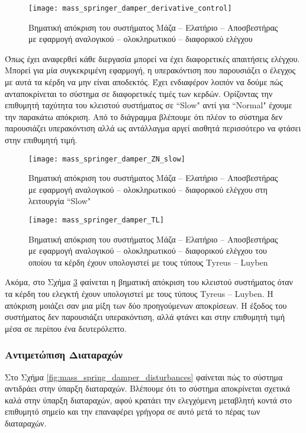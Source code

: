 \begin{figure}[h]
  \centering
  \texttt{[image: mass\_springer\_damper\_derivative\_control]}
  \caption{Βηματική απόκριση του συστήματος Μάζα -- Ελατήριο -- Αποσβεστήρας με εφαρμογή αναλογικού -- ολοκληρωτικού -- διαφορικού ελέγχου}
  \label{fig:mass_springer_damper_derivative_control}
\end{figure}

Όπως έχει αναφερθεί κάθε διεργασία μπορεί να έχει διαφορετικές απαιτήσεις ελέγχου. Μπορεί για μία συγκεκριμένη εφαρμογή, η υπερακόντιση που παρουσιάζει ο έλεγχος με αυτά τα κέρδη να μην είναι αποδεκτός. Έχει ενδιαφέρον λοιπόν να δούμε πώς ανταποκρίνεται το σύστημα σε διαφορετικές τιμές των κερδών. Ορίζοντας την επιθυμητή ταχύτητα του κλειστού συστήματος σε ``Slow" αντί για ``Normal" έχουμε την παρακάτω απόκριση. Από το διάγραμμα βλέπουμε ότι πλέον το σύστημα δεν παρουσιάζει υπερακόντιση αλλά ως αντάλλαγμα αργεί αισθητά περισσότερο να φτάσει στην επιθυμητή τιμή.

\begin{figure}[h]
  \centering
  \texttt{[image: mass\_springer\_damper\_ZN\_slow]}
  \caption{Βηματική απόκριση του συστήματος Μάζα -- Ελατήριο -- Αποσβεστήρας με εφαρμογή αναλογικού -- ολοκληρωτικού -- διαφορικού ελέγχου στη λειτουργία ``Slow"}
  \label{fig:mass_springer_damper_ZN_slow}
\end{figure}

\begin{figure}[h]
  \centering
  \texttt{[image: mass\_springer\_damper\_TL]}
  \caption{Βηματική απόκριση του συστήματος Μάζα -- Ελατήριο -- Αποσβεστήρας με εφαρμογή αναλογικού -- ολοκληρωτικού -- διαφορικού ελέγχου του οποίου τα κέρδη έχουν υπολογιστεί με τους τύπους Tyreus -- Luyben}
  \label{fig:mass_springer_damper_TL}
\end{figure}

Ακόμα, στο Σχήμα \ref{fig:mass_springer_damper_TL} φαίνεται η βηματική απόκριση του κλειστού συστήματος όταν τα κέρδη του ελεγκτή έχουν υπολογιστεί με τους τύπους Tyreus -- Luyben. Η απόκριση μοιάζει σαν μια μίξη των δύο προηγούμενων αποκρίσεων. Η έξοδος του συστήματος δεν παρουσιάζει υπερακόντιση, αλλά φτάνει και στην επιθυμητή τιμή μέσα σε περίπου ένα δευτερόλεπτο.

\subsubsection{Αντιμετώπιση Διαταραχών}
Στο Σχήμα \ref{fig:mass_spring_damper_disturbances} φαίνεται πώς το σύστημα αντιδράει στην ύπαρξη διαταραχών. Βλέπουμε ότι το σύστημα αποκρίνεται σχετικά καλά στην ύπαρξη διαταραχών, αφού κρατάει την ελεγχόμενη μεταβλητή κοντά στο επιθυμητό σημείο και την επαναφέρει γρήγορα σε αυτό μετά το πέρας των διαταραχών.

